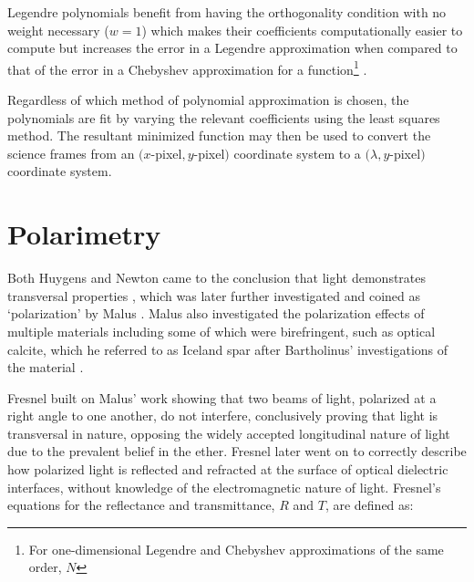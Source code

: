 Legendre polynomials benefit from having the orthogonality condition with no weight necessary ($w = 1$) which makes their coefficients computationally easier to compute but increases the error in a Legendre approximation when compared to that of the error in a Chebyshev approximation for a function\footnote{For one-dimensional Legendre and Chebyshev approximations of the same order, $N$} \citep{leg_cheb_relation}.
\prgph

Regardless of which method of polynomial approximation is chosen, the polynomials are fit by varying the relevant coefficients using the least squares method. The resultant minimized function may then be used to convert the science frames from an $(x$-pixel$, y$-pixel$)$ coordinate system to a $(\lambda, y$-pixel$)$ coordinate system.


\section{Polarimetry}\label{sec:polarimetry}

Both Huygens and Newton came to the conclusion that light demonstrates transversal properties \citep{Huygens, opticks}, which was later further investigated and coined as `polarization' by Malus \citep{Pol_Malus}. Malus also investigated the polarization effects of multiple materials including some of which were birefringent, such as optical calcite, which he referred to as Iceland spar after Bartholinus' investigations of the material \citep{Bartholinus}.

\prgph

Fresnel built on Malus' work showing that two beams of light, polarized at a right angle to one another, do not interfere, conclusively proving that light is transversal in nature, opposing the widely accepted longitudinal nature of light due to the prevalent belief in the ether. Fresnel later went on to correctly describe how polarized light is reflected and refracted at the surface of optical dielectric interfaces, without knowledge of the electromagnetic nature of light. Fresnel's equations for the reflectance and transmittance, $R$ and $T$, are defined as:

